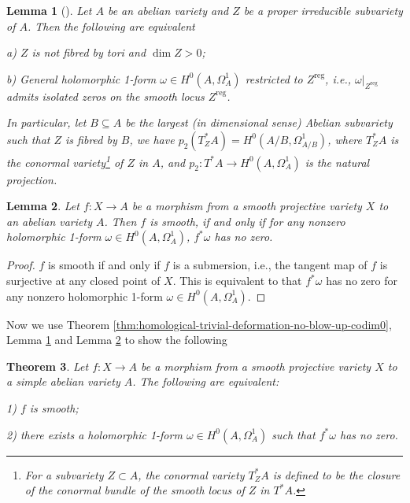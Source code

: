 \documentclass[a4paper,12pt,reqno]{amsart}
\newtheorem{theorem}{Theorem}[section]
\newtheorem{lemma}[theorem]{Lemma}
\theoremstyle{question}
\theoremstyle{definition}
\theoremstyle{remark}
\theoremstyle{cited}
\theoremstyle{citeddef}
\begin{document}
\begin{lemma}[{\cite[Proposition 3.2]{DHL24}}]\label{prop:DHL}
   Let $A$ be an abelian variety and $Z$ be a proper irreducible subvariety of $A$. Then the following are equivalent
   
a) $Z$ is not fibred by tori and $\dim Z > 0$;

b) General holomorphic 1-form $\omega\in H^0(A,\Omega^1_A)$ restricted to $Z^{\text{reg}}$, i.e., $\omega|_{Z^{\text{reg}}}$ admits isolated
zeros on the smooth locus $Z^{\text{reg}}$. 

 In particular, let $B \subseteq A$ be the largest (in dimensional sense) Abelian subvariety such that $Z$ is fibred by $B$, we have $p_2(T_Z^*A) = H^0(A/B,\Omega^1_{A/B})$, where $T_Z^*A$ is the conormal variety\footnote{For a subvariety $Z\subset A$, the conormal variety $T^*_{Z}A$ is defined to be the closure of the conormal bundle of the smooth locus of $Z$ in $T^*A$.} of $Z$ in $A$, and $p_2\colon T^*A\to H^0(A, \Omega_A^1)$ is the natural projection.
\end{lemma}

\begin{lemma}\label{lem:smooth-all-forms}
   Let $f\colon X\to A$ be a morphism from a smooth projective variety $X$ to an abelian variety $A$. Then $f$ is smooth, if and only if for any nonzero holomorphic 1-form $\omega\in H^0(A, \Omega_A^1)$, $f^*\omega$ has no zero.
\end{lemma}

\begin{proof}
$f$ is smooth if and only if $f$ is a submersion, i.e., the tangent map of $f$ is surjective at any closed point of $X$. This is equivalent to that $f^*\omega$ has no zero for any nonzero holomorphic 1-form $\omega\in H^0(A, \Omega_A^1)$.
\end{proof}

Now we use Theorem \ref{thm:homological-trivial-deformation-no-blow-up-codim0}, Lemma \ref{prop:DHL} and Lemma \ref{lem:smooth-all-forms} to show the following

\begin{theorem}\label{thm:simple-nowhere vanishing 1-form}
    Let $f\colon X\to A$ be a morphism from a smooth projective variety $X$ to a simple abelian variety $A$. The following are equivalent:

    1) $f$ is smooth;
    
    2) there exists a holomorphic 1-form $\omega\in H^0(A, \Omega^1_A)$ such that $f^*\omega$ has no zero.
\end{theorem}
\end{document}
